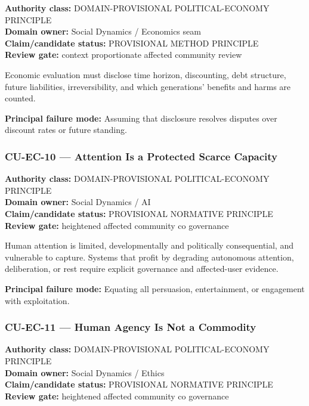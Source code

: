 \documentclass[
  11pt,
]{article}
\begin{document}
\textbf{Authority class:} DOMAIN-PROVISIONAL POLITICAL-ECONOMY
PRINCIPLE\\
\textbf{Domain owner:} Social Dynamics / Economics seam\\
\textbf{Claim/candidate status:} PROVISIONAL METHOD PRINCIPLE\\
\textbf{Review gate:} context proportionate affected community review

Economic evaluation must disclose time horizon, discounting, debt
structure, future liabilities, irreversibility, and which generations'
benefits and harms are counted.

\textbf{Principal failure mode:} Assuming that disclosure resolves
disputes over discount rates or future standing.

\subsubsection{CU-EC-10 --- Attention Is a Protected Scarce
Capacity}\label{cu-ec-10-attention-is-a-protected-scarce-capacity}

\textbf{Authority class:} DOMAIN-PROVISIONAL POLITICAL-ECONOMY
PRINCIPLE\\
\textbf{Domain owner:} Social Dynamics / AI\\
\textbf{Claim/candidate status:} PROVISIONAL NORMATIVE PRINCIPLE\\
\textbf{Review gate:} heightened affected community co governance

Human attention is limited, developmentally and politically
consequential, and vulnerable to capture. Systems that profit by
degrading autonomous attention, deliberation, or rest require explicit
governance and affected-user evidence.

\textbf{Principal failure mode:} Equating all persuasion, entertainment,
or engagement with exploitation.

\subsubsection{CU-EC-11 --- Human Agency Is Not a
Commodity}\label{cu-ec-11-human-agency-is-not-a-commodity}

\textbf{Authority class:} DOMAIN-PROVISIONAL POLITICAL-ECONOMY
PRINCIPLE\\
\textbf{Domain owner:} Social Dynamics / Ethics\\
\textbf{Claim/candidate status:} PROVISIONAL NORMATIVE PRINCIPLE\\
\textbf{Review gate:} heightened affected community co governance
\end{document}
